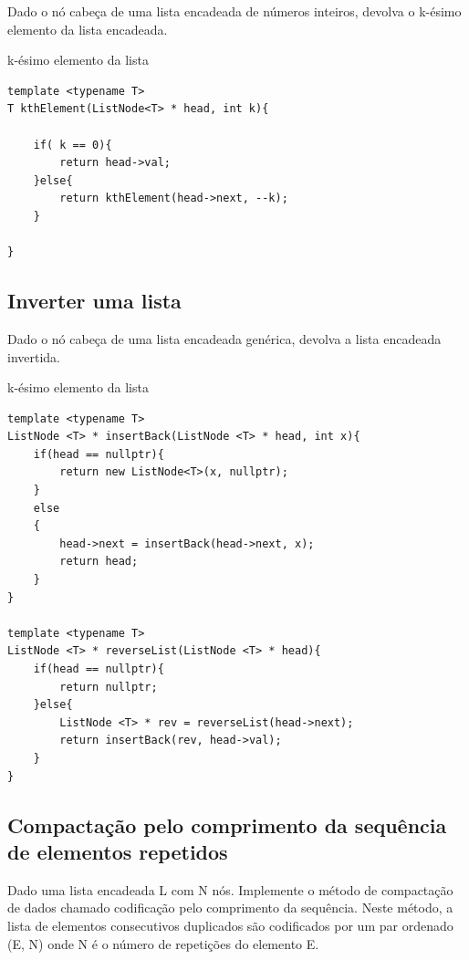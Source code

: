 Dado o nó cabeça de uma lista encadeada de números inteiros, devolva o k-ésimo elemento da lista encadeada.

\begin{listing}[!ht]
\caption{k-ésimo elemento da lista}

\begin{verbatim}
template <typename T>
T kthElement(ListNode<T> * head, int k){

    if( k == 0){
        return head->val;
    }else{
        return kthElement(head->next, --k);
    }

}

\end{verbatim}
\end{listing}


\subsection{Inverter uma lista}

Dado o nó cabeça de uma lista encadeada genérica, devolva a lista encadeada invertida.

\begin{listing}[!ht]
\caption{k-ésimo elemento da lista}

\begin{verbatim}
template <typename T>
ListNode <T> * insertBack(ListNode <T> * head, int x){
    if(head == nullptr){
        return new ListNode<T>(x, nullptr);
    }
    else
    {    
        head->next = insertBack(head->next, x);
        return head;    
    }
}

template <typename T>
ListNode <T> * reverseList(ListNode <T> * head){
    if(head == nullptr){
        return nullptr;
    }else{
        ListNode <T> * rev = reverseList(head->next);
        return insertBack(rev, head->val);
    }
}

\end{verbatim}
\end{listing}

\subsection{Compactação pelo comprimento da sequência de elementos repetidos}

Dado uma lista encadeada L com N nós. Implemente o método de compactação de dados chamado codificação pelo comprimento da sequência. Neste método, a lista de  elementos consecutivos duplicados são codificados por um par ordenado (E, N) onde N é o número de repetições do elemento E.

